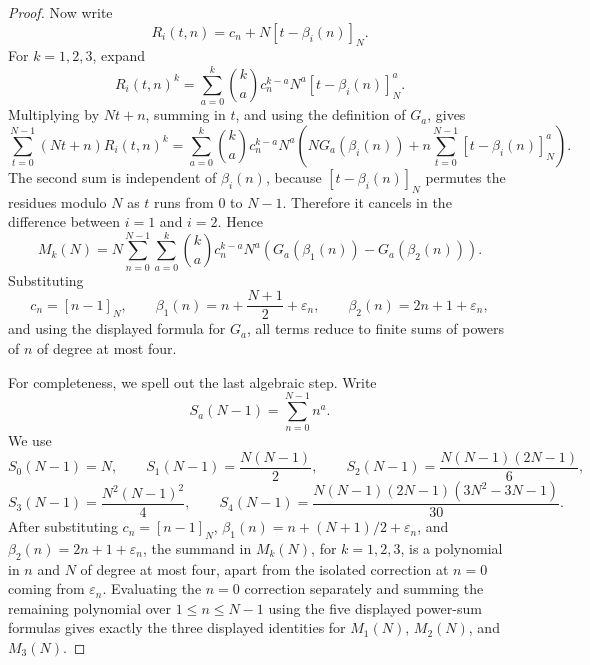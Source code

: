 \documentclass{article}
\theoremstyle{definition}
\numberwithin{equation}{section}
\begin{document}
\begin{proof}
Now write
\begin{equation}
R_i(t,n)=c_n+N[t-\beta_i(n)]_N.
\end{equation}
For $k=1,2,3$, expand
\begin{equation}
R_i(t,n)^k
=
\sum_{a=0}^{k}
\binom{k}{a}
 c_n^{k-a}N^a[t-\beta_i(n)]_N^a.
\end{equation}
Multiplying by $Nt+n$, summing in $t$, and using the definition of $G_a$, gives
\begin{equation}
\sum_{t=0}^{N-1}(Nt+n)R_i(t,n)^k
=
\sum_{a=0}^{k}
\binom{k}{a}
 c_n^{k-a}N^a
\left(NG_a(\beta_i(n))+n\sum_{t=0}^{N-1}[t-\beta_i(n)]_N^a\right).
\end{equation}
The second sum is independent of $\beta_i(n)$, because $[t-\beta_i(n)]_N$ permutes the residues modulo $N$ as $t$ runs from $0$ to $N-1$.  Therefore it cancels in the difference between $i=1$ and $i=2$.  Hence
\begin{equation}
M_k(N)
=
N\sum_{n=0}^{N-1}
\sum_{a=0}^{k}
\binom{k}{a}
 c_n^{k-a}N^a
\left(G_a(\beta_1(n))-G_a(\beta_2(n))\right).
\end{equation}
Substituting
\begin{equation}
c_n=[n-1]_N,
\qquad
\beta_1(n)=n+\frac{N+1}{2}+\varepsilon_n,
\qquad
\beta_2(n)=2n+1+\varepsilon_n,
\end{equation}
and using the displayed formula for $G_a$, all terms reduce to finite sums of powers of $n$ of degree at most four.

For completeness, we spell out the last algebraic step.  Write
\begin{equation}
S_a(N-1)=\sum_{n=0}^{N-1}n^a.
\end{equation}
We use
\begin{equation}
S_0(N-1)=N,
\qquad
S_1(N-1)=\frac{N(N-1)}{2},
\qquad
S_2(N-1)=\frac{N(N-1)(2N-1)}{6},
\end{equation}
\begin{equation}
S_3(N-1)=\frac{N^2(N-1)^2}{4},
\qquad
S_4(N-1)=\frac{N(N-1)(2N-1)(3N^2-3N-1)}{30}.
\end{equation}
After substituting $c_n=[n-1]_N$, $\beta_1(n)=n+(N+1)/2+\varepsilon_n$, and $\beta_2(n)=2n+1+\varepsilon_n$, the summand in $M_k(N)$, for $k=1,2,3$, is a polynomial in $n$ and $N$ of degree at most four, apart from the isolated correction at $n=0$ coming from $\varepsilon_n$.  Evaluating the $n=0$ correction separately and summing the remaining polynomial over $1\leq n\leq N-1$ using the five displayed power-sum formulas gives exactly the three displayed identities for $M_1(N)$, $M_2(N)$, and $M_3(N)$.
\end{proof}
\end{document}
